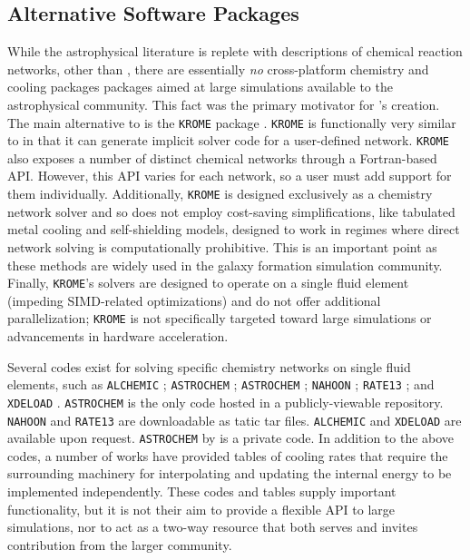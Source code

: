 \subsection{Alternative Software Packages}

While the astrophysical literature is replete with descriptions of chemical
reaction networks, other than \grackle{}, there are essentially \textit{no}
cross-platform chemistry and cooling packages packages aimed at large
simulations available to the astrophysical community.  This fact was the primary
motivator for \grackle{}'s creation.  The main alternative to \grackle{} is the 
\texttt{KROME} package
\citep{2014MNRAS.439.2386G}.  \texttt{KROME} is functionally very
similar to \dengo{} in that it can generate implicit solver code for a
user-defined network.  \texttt{KROME} also exposes a number of
distinct chemical networks through a Fortran-based API.  However, this
API varies for each network, so a user must add support for them
individually.  Additionally, \texttt{KROME} is designed exclusively as
a chemistry network solver and so does not employ cost-saving
simplifications, like tabulated metal cooling and self-shielding
models, designed to work in regimes where direct network solving is
computationally prohibitive.  This is an important point as these
methods are widely used in the galaxy formation simulation community.
Finally, \texttt{KROME}'s solvers are designed to operate on a single
fluid element (impeding SIMD-related optimizations) and do not offer additional
parallelization; \texttt{KROME} is not specifically targeted toward large
simulations or advancements in hardware acceleration.

Several codes exist for solving specific chemistry
networks on single fluid elements, such as 
\texttt{ALCHEMIC} \citep{2010A&A...522A..42S}; \texttt{ASTROCHEM}
\citep{2013MNRAS.431..455K}; \texttt{ASTROCHEM} \citep[][unrelated to
the first \texttt{ASTROCHEM}]{2013A&A...559A..53M}; \texttt{NAHOON}
\citep{2012ApJS..199...21W}; \texttt{RATE13} \citep[associated with
  the UMIST database][]{2013A&A...550A..36M}; and \texttt{XDELOAD}
\citep{2005Ap&SS.299....1N}.  \texttt{ASTROCHEM}
\citep{2013A&A...559A..53M} is the only code hosted in a
publicly-viewable repository.  \texttt{NAHOON} and \texttt{RATE13} are
downloadable as tatic tar files.  \texttt{ALCHEMIC} and
\texttt{XDELOAD} are available upon request.  \texttt{ASTROCHEM} by
\citet{2013MNRAS.431..455K} is a private code.
In addition to the above codes, a number of works have provided tables
of cooling rates \citep{1993ApJS...88..253S, 2009MNRAS.393...99W,
2013MNRAS.434.1043O} that require the surrounding machinery for
interpolating and updating the internal energy to be implemented
independently.
These codes and tables supply important functionality, but it is
not their aim to provide a flexible API to large simulations, nor to
act as a two-way resource that both serves and invites contribution
from the larger community.


